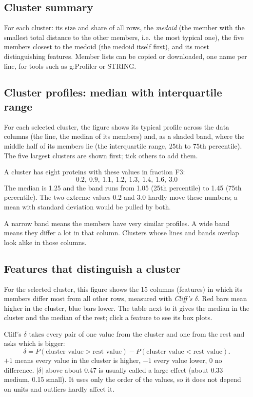 \documentclass[11pt,a4paper]{article}
\begin{document}
\subsection{Cluster summary}

For each cluster: its size and share of all rows, the \emph{medoid} (the member with the smallest total distance to
the other members, i.e.\ the most typical one), the five members closest to the medoid (the medoid itself first), and its most distinguishing
features. Member lists can be copied or downloaded, one name per line, for tools such as g:Profiler or STRING.

\subsection{Cluster profiles: median with interquartile range}

For each selected cluster, the figure shows its typical profile across the data columns (the line, the median of its
members) and, as a shaded band, where the middle half of its members lie (the interquartile range, 25th to 75th
percentile). The five largest clusters are shown first; tick others to add them.

\begin{example}
A cluster has eight proteins with these values in fraction F3:
\[
  0.2,\ 0.9,\ 1.1,\ 1.2,\ 1.3,\ 1.4,\ 1.6,\ 3.0
\]
The median is 1.25 and the band runs from 1.05 (25th percentile) to 1.45 (75th percentile). The two extreme values
0.2 and 3.0 hardly move these numbers; a mean with standard deviation would be pulled by both.
\end{example}

A narrow band means the members have very similar profiles. A wide band means they differ a lot in that column.
Clusters whose lines and bands overlap look alike in those columns.

\subsection{Features that distinguish a cluster}

For the selected cluster, this figure shows the 15 columns (features) in which its members differ most from all
other rows, measured with \emph{Cliff's $\delta$}. Red bars mean higher in the cluster, blue bars lower. The table
next to it gives the median in the cluster and the median of the rest; click a feature to see its box plots.

Cliff's $\delta$ takes every pair of one value from the cluster and one from the rest and asks which is bigger:
\[
  \delta = P(\text{cluster value} > \text{rest value}) - P(\text{cluster value} < \text{rest value}).
\]
$+1$ means every value in the cluster is higher, $-1$ every value lower, 0 no difference. $|\delta|$ above about
0.47 is usually called a large effect (about 0.33 medium, 0.15 small). It uses only the order of the values, so it
does not depend on units and outliers hardly affect it.
\end{document}
